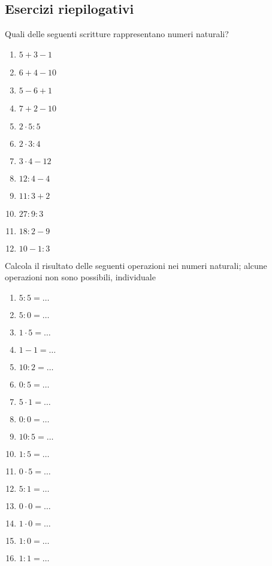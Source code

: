 \subsection{Esercizi riepilogativi}
\begin{esercizio}
Quali delle seguenti scritture rappresentano numeri naturali?
 \begin{multicols}{4}
 \begin{enumerate}[noitemsep, label=(\alph*)]
 \item \(5+3-1\)
 \item \(6+4-10\)
 \item \(5-6+1\)
 \item \(7+2-10\)
 \item \(2\cdot5:5\)
 \item \(2\cdot3:4\)
 \item \(3\cdot4-12\)
 \item \(12:4-4\)
 \item \(11:3+2\)
 \item \(27:9:3\)
 \item \(18:2-9\)
 \item \(10-1:3\)
 \end{enumerate}
 \end{multicols}
\end{esercizio}


\begin{esercizio}
Calcola il risultato delle seguenti operazioni nei numeri naturali; 
alcune operazioni non sono possibili, individuale
 \begin{multicols}{4}
 \begin{enumerate}[noitemsep, label=(\alph*)]
 \item \(5:5=\ldots\)
 \item \(5:0=\ldots\)
 \item \(1\cdot 5 =\ldots\)
 \item \(1-1=\ldots\)
 \item \(10:2=\ldots\)
 \item \(0:5=\ldots\)
 \item \(5\cdot1=\ldots\)
 \item \(0:0=\ldots\)
 \item \(10:5=\ldots\)
 \item \(1:5=\ldots\)
 \item \(0\cdot5=\ldots\)
 \item \(5:1=\ldots\)
 \item \(0\cdot0=\ldots\)
 \item \(1\cdot0=\ldots\)
 \item \(1:0=\ldots\)
 \item \(1:1=\ldots\)
 \end{enumerate}
 \end{multicols}
\end{esercizio}

